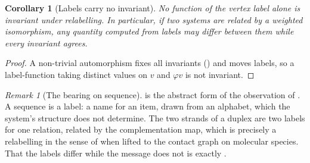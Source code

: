 \documentclass[11pt,twocolumn,a4paper]{article}
\newtheorem{corollary}[theorem]{Corollary}
\theoremstyle{definition}
\theoremstyle{remark}
\newtheorem{remark}[theorem]{Remark}
\begin{document}
\begin{corollary}[Labels carry no invariant]
\label{cor:labels}
No function of the vertex label alone is invariant under relabelling. In
particular, if two systems are related by a weighted isomorphism, any
quantity computed from labels may differ between them while every
invariant agrees.
\end{corollary}

\begin{proof}
A non-trivial automorphism fixes all invariants ()
and moves labels, so a label-function taking distinct values on $v$ and
$\varphi v$ is not invariant.
\end{proof}

\begin{remark}[The bearing on sequence]
\label{rem:bearing}
 is the abstract form of the observation of
. A sequence is a label: a name for an item, drawn from an
alphabet, which the system's structure does not determine. The two strands
of a duplex are two labels for one relation, related by the complementation
map, which is precisely a relabelling in the sense of  when
lifted to the contact graph on molecular species. That the labels differ
while the message does not is exactly .
\end{remark}
\end{document}
